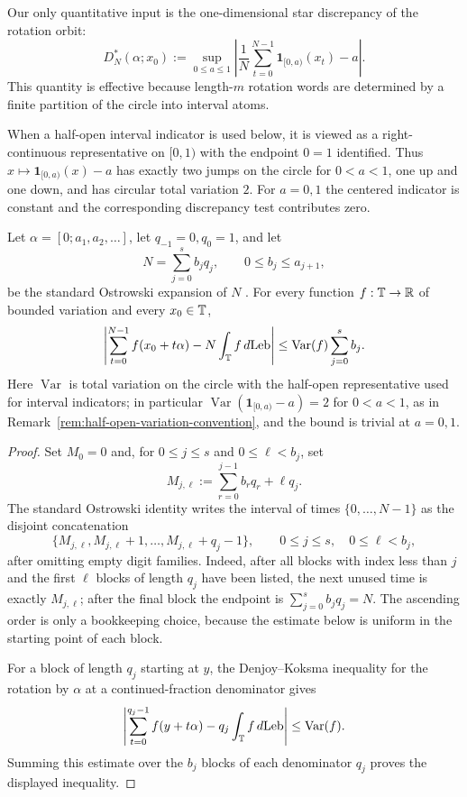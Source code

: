 Our only quantitative input is the one-dimensional star discrepancy of the
rotation orbit:
\[
D_N^*(\alpha;x_0)
:=
\sup_{0\le a\le 1}
\left|
\frac{1}{N}\sum_{t=0}^{N-1}\mathbf{1}_{[0,a)}(x_t)-a
\right|.
\]
This quantity is effective because length-$m$ rotation words are determined by a
finite partition of the circle into interval atoms.

\begin{remark}\label{rem:half-open-variation-convention}
When a half-open interval indicator is used below, it is viewed as a
right-continuous representative on \([0,1)\) with the endpoint \(0=1\)
identified.  Thus \(x\mapsto \mathbf 1_{[0,a)}(x)-a\) has exactly two jumps on
the circle for \(0<a<1\), one up and one down, and has circular total variation
\(2\).  For \(a=0,1\) the centered indicator is constant and the corresponding
discrepancy test contributes zero.
\end{remark}

\begin{lemma}\label{lem:ostrowski-block-discrepancy}
Let \(\alpha=[0;a_1,a_2,\dots]\), let \(q_{-1}=0,q_0=1\), and let
\[
N=\sum_{j=0}^s b_jq_j,\qquad 0\le b_j\le a_{j+1},
\]
be the standard Ostrowski expansion of \(N\)
\cite[Ch.~I, Sec.~4]{Cassels1957}.  For every function
\(f:\mathbb{T}\to\mathbb R\) of bounded variation and every \(x_0\in\mathbb{T}\),
\[
\left|
\sum_{t=0}^{N-1} f(x_0+t\alpha)-N\int_{\mathbb{T}}f\,d\mathrm{Leb}
\right|
\le
\operatorname{Var}(f)\sum_{j=0}^s b_j .
\]
Here \(\operatorname{Var}\) is total variation on the circle with the
half-open representative used for interval indicators; in particular
\(\operatorname{Var}(\mathbf 1_{[0,a)}-a)=2\) for \(0<a<1\), as in
Remark~\ref{rem:half-open-variation-convention}, and the bound is trivial at
\(a=0,1\).
\end{lemma}

\begin{proof}
Set \(M_0=0\) and, for \(0\le j\le s\) and \(0\le \ell<b_j\), set
\[
M_{j,\ell}:=\sum_{r=0}^{j-1}b_rq_r+\ell q_j .
\]
The standard Ostrowski identity writes the interval of times
\(\{0,\ldots,N-1\}\) as the disjoint concatenation
\[
\{M_{j,\ell},M_{j,\ell}+1,\ldots,M_{j,\ell}+q_j-1\},
\qquad 0\le j\le s,\quad 0\le \ell<b_j,
\]
after omitting empty digit families.  Indeed, after all blocks with index
less than \(j\) and the first \(\ell\) blocks of length \(q_j\) have been
listed, the next unused time is exactly \(M_{j,\ell}\); after the final block
the endpoint is \(\sum_{j=0}^s b_jq_j=N\).  The ascending order is only a
bookkeeping choice, because the estimate below is uniform in the starting
point of each block.

For a block of length \(q_j\) starting at \(y\), the Denjoy--Koksma inequality
for the rotation by \(\alpha\) at a continued-fraction denominator
\cite[Ch.~2, Sec.~5]{KuipersNiederreiter1974} gives
\[
\left|
\sum_{t=0}^{q_j-1} f(y+t\alpha)-q_j\int_{\mathbb{T}}f\,d\mathrm{Leb}
\right|
\le \operatorname{Var}(f).
\]
Summing this estimate over the \(b_j\) blocks of each denominator \(q_j\)
proves the displayed inequality.
\end{proof}


